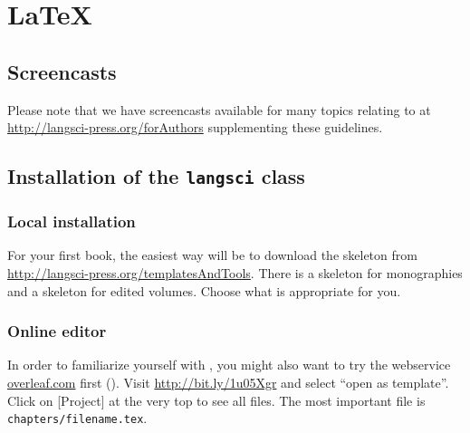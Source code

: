 \chapter{\LaTeX}

\section{Screencasts}
Please note that we have screencasts available for many topics relating to {\latex} at \url{http://langsci-press.org/forAuthors} supplementing these guidelines.

\section{Installation of the \texttt{langsci} class}
\subsection{Local installation}
For your first book, the easiest way will be to download the skeleton from \url{http://langsci-press.org/templatesAndTools}.
There is a skeleton for monographies and a skeleton for edited volumes. Choose what is appropriate for you.
 


\subsection{Online editor}
In order to familiarize yourself with \latex, you might also want to try the webservice \url{overleaf.com} first (). Visit \url{http://bit.ly/1u05Xgr} and select ``open as template''. Click on [Project] at the very top to see all files. The most important file is \verb+chapters/filename.tex+.

